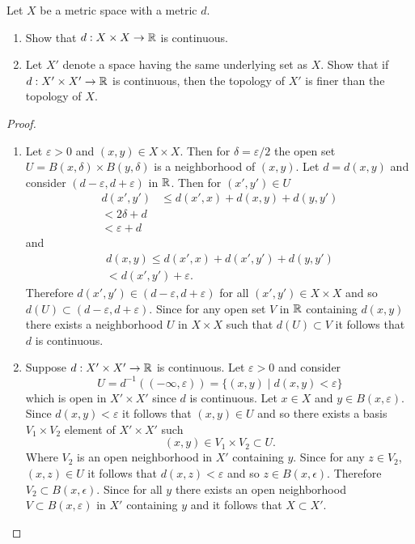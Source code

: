 \begin{ex}{20.3}
    Let $X$ be a metric space with a metric $d$.
    \begin{enumerate}
        \item Show that $d:X\times X\to\mathbb{R}$ is continuous.
        \item Let $X'$ denote a space having the same underlying set as $X$. Show that if $d:X'\times X'\to\mathbb{R}$ is continuous, then the topology of $X'$ is finer than the topology of $X$.
    \end{enumerate}
\end{ex}
\begin{proof}
    ${}$
    \begin{enumerate}
        \item Let $\varepsilon>0$ and $(x,y)\in X\times X$. Then for $\delta=\varepsilon/2$ the open set $U =B(x,\delta)\times B(y,\delta)$ is a neighborhood of $(x,y)$.
            Let $d=d(x,y)$ and consider $(d-\varepsilon, d+\varepsilon)$ in $\mathbb{R}$. 
            Then for $(x',y')\in U$
            \begin{align*}
                d(x',y')&\leq d(x',x)+d(x,y)+d(y,y')\\
                < 2\delta+ d\\
                < \varepsilon+d
            \end{align*}
            and
            \begin{align*}
                d(x,y)\leq d(x',x)+d(x',y')+d(y,y')\\
                <d(x',y')+\varepsilon.
            \end{align*}
            Therefore $d(x',y')\in(d-\varepsilon,d+\varepsilon)$ for all $(x',y')\in X\times X$ and so $d(U)\subset (d-\varepsilon,d+\varepsilon)$.
            Since for any open set $V$ in $\mathbb{R}$ containing $d(x,y)$ there exists a neighborhood $U$ in $X\times X$ such that $d(U)\subset V$ it follows that $d$ is continuous.
        \item  Suppose $d:X'\times X'\to \mathbb{R}$ is continuous. Let $\varepsilon>0$ and consider
            $$ U = d^{-1}\left((-\infty,\varepsilon)\right)=\{(x,y)\mid d(x,y)<\varepsilon\}$$
            which is open in $X'\times X'$ since $d$ is continuous. Let $x\in X$ and $y\in B(x,\varepsilon)$.
            Since $d(x,y)<\varepsilon$ it follows that $(x,y)\in U$ and so there exists a basis $V_1\times V_2$ element of $X'\times X'$ such
            $$ (x,y)\in V_1\times V_2\subset U.$$
            Where $V_2$ is an open neighborhood in $X'$ containing $y$.
            Since for any $z\in V_2$, $(x,z)\in U$ it follows that $d(x,z)<\varepsilon$ and so $z\in B(x,\epsilon)$. Therefore $V_2\subset B(x,\epsilon)$.
            Since for all $y$ there exists an open neighborhood $V\subset B(x,\varepsilon)$ in $X'$ containing $y$ and it follows that $X\subset X'$.
    \end{enumerate}
\end{proof}

